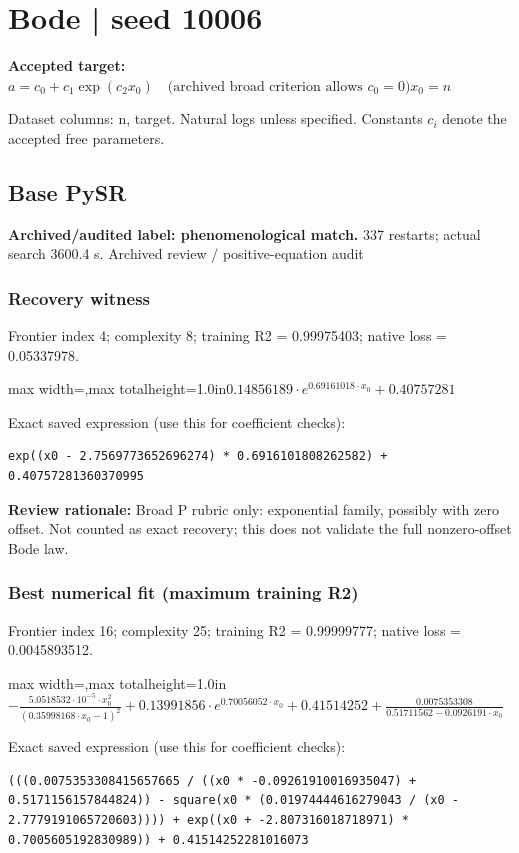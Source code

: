 \documentclass[10pt,letterpaper,landscape]{article}
\begin{document}
\section*{Bode | seed 10006}
\textbf{Accepted target:} $\displaystyle a=c_0+c_1\exp(c_2x_0)\quad\text{(archived broad criterion allows }c_0=0\text{)}$\hfill $x_0=n$\par
{\small Dataset columns: n, target. Natural logs unless specified. Constants $c_i$ denote the accepted free parameters.}\par\medskip
\begin{minipage}[t]{0.485\textwidth}
\subsection*{Base PySR}
\textbf{Archived/audited label: phenomenological match.} 337 restarts; actual search 3600.4 s.
{\small Archived review / positive-equation audit}
\subsubsection*{Recovery witness}
Frontier index 4; complexity 8; training R2 = 0.99975403; native loss = 0.05337978.
\begin{center}\begin{adjustbox}{max width=\linewidth,max totalheight=1.0in}$\displaystyle 0.14856189 \cdot e^{0.69161018 \cdot x_{0}} + 0.40757281$\end{adjustbox}\end{center}
{\scriptsize Exact saved expression (use this for coefficient checks):}
\begin{lstlisting}
exp((x0 - 2.7569773652696274) * 0.6916101808262582) + 0.40757281360370995
\end{lstlisting}
{\small\textbf{Review rationale:} Broad P rubric only: exponential family, possibly with zero offset. Not counted as exact recovery; this does not validate the full nonzero-offset Bode law.}
\subsubsection*{Best numerical fit (maximum training R2)}
Frontier index 16; complexity 25; training R2 = 0.99999777; native loss = 0.0045893512.
\begin{center}\begin{adjustbox}{max width=\linewidth,max totalheight=1.0in}$\displaystyle - \frac{5.0518532 \cdot 10^{-5} \cdot x_{0}^{2}}{\left(0.35998168 \cdot x_{0} - 1\right)^{2}} + 0.13991856 \cdot e^{0.70056052 \cdot x_{0}} + 0.41514252 + \frac{0.0075353308}{0.51711562 - 0.0926191 \cdot x_{0}}$\end{adjustbox}\end{center}
{\scriptsize Exact saved expression (use this for coefficient checks):}
\begin{lstlisting}
(((0.0075353308415657665 / ((x0 * -0.09261910016935047) + 0.5171156157844824)) - square(x0 * (0.01974444616279043 / (x0 - 2.7779191065720603)))) + exp((x0 + -2.807316018718971) * 0.7005605192830989)) + 0.41514252281016073
\end{lstlisting}
\end{minipage}\hfill
\end{document}
